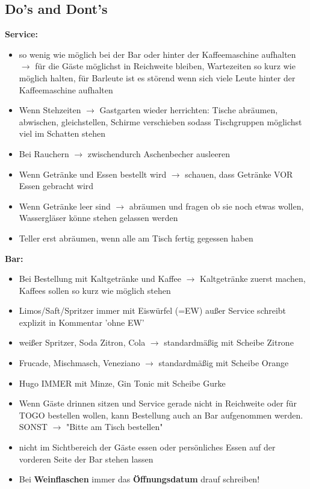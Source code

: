 \documentclass[a4paper,12pt]{article}
\newcounter{row}
\begin{document}
\subsection{Do's and Dont's}
\textbf{Service:}
\begin{itemize}[topsep=0pt, itemsep=0pt]
    \item[] so wenig wie möglich bei der Bar oder hinter der Kaffeemaschine aufhalten $\rightarrow$ für die Gäste möglichst in Reichweite bleiben, Wartezeiten so kurz wie möglich halten, für Barleute ist es störend wenn sich viele Leute hinter der Kaffeemaschine aufhalten
    \item[] Wenn Stehzeiten $\rightarrow$ Gastgarten wieder herrichten: Tische abräumen, abwischen, gleichstellen, Schirme verschieben sodass Tischgruppen möglichst viel im Schatten stehen
    \item[] Bei Rauchern $\rightarrow$ zwischendurch Aschenbecher ausleeren
    \item[] Wenn Getränke und Essen bestellt wird $\rightarrow$ schauen, dass Getränke VOR Essen gebracht wird
    \item[] Wenn Getränke leer sind $\rightarrow$ abräumen und fragen ob sie noch etwas wollen, Wassergläser könne stehen gelassen werden
    \item[] Teller erst abräumen, wenn alle am Tisch fertig gegessen haben
\end{itemize}
\vspace{1em}

\textbf{Bar:}
\begin{itemize}[topsep=0pt, itemsep=0pt]
    \item[] Bei Bestellung mit Kaltgetränke und Kaffee $\rightarrow$ Kaltgetränke zuerst machen, Kaffees sollen so kurz wie möglich stehen 
    \item[] Limos/Saft/Spritzer immer mit Eiswürfel (=EW) außer Service schreibt explizit in Kommentar 'ohne EW'
    \item[] weißer Spritzer, Soda Zitron, Cola $\rightarrow$ standardmäßig mit Scheibe Zitrone
    \item[] Frucade, Mischmasch, Veneziano $\rightarrow$ standardmäßig mit Scheibe Orange
    \item[] Hugo IMMER mit Minze, Gin Tonic mit Scheibe Gurke
    \item[] Wenn Gäste drinnen sitzen und Service gerade nicht in Reichweite oder für TOGO bestellen wollen, kann Bestellung auch an Bar aufgenommen werden. SONST $\rightarrow$ "Bitte am Tisch bestellen"
    \item[] nicht im Sichtbereich der Gäste essen oder persönliches Essen auf der vorderen Seite der Bar stehen lassen
    \item[] Bei \textbf{Weinflaschen} immer das \textbf{Öffnungsdatum} drauf schreiben!
\end{itemize}
\end{document}
